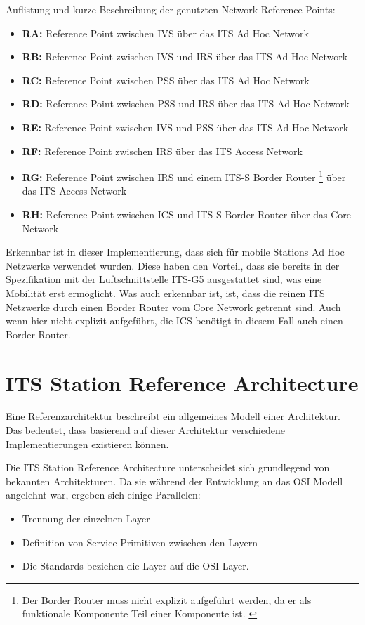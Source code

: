 Auflistung und kurze Beschreibung der genutzten Network Reference Points:
\begin{itemize}
	\item \textbf{RA: } Reference Point zwischen \ac{IVS} über das ITS Ad Hoc Network
	\item \textbf{RB: } Reference Point zwischen \ac{IVS} und \ac{IRS} über das ITS Ad Hoc Network
	\item \textbf{RC: } Reference Point zwischen \ac{PSS} über das ITS Ad Hoc Network
	\item \textbf{RD: } Reference Point zwischen \ac{PSS} und \ac{IRS} über das ITS Ad Hoc Network
	\item \textbf{RE: } Reference Point zwischen \ac{IVS} und \ac{PSS} über das ITS Ad Hoc Network
	\item \textbf{RF: } Reference Point zwischen \ac{IRS} über das ITS Access Network
	\item \textbf{RG: } Reference Point zwischen \ac{IRS} und einem ITS-S Border Router \footnote{Der Border Router muss nicht explizit aufgeführt werden, da er als funktionale Komponente Teil einer Komponente ist. \label{ftn:borderRouter}} über das ITS Access Network 
	\item \textbf{RH: } Reference Point zwischen \ac{ICS} und ITS-S Border Router  über das Core Network		
\end{itemize}

Erkennbar ist in dieser Implementierung, dass sich für mobile Stations Ad Hoc Netzwerke verwendet wurden. Diese haben den Vorteil, dass sie bereits in der Spezifikation mit der Luftschnittstelle ITS-G5 ausgestattet sind, was eine Mobilität erst ermöglicht. Was auch erkennbar ist, ist, dass die reinen ITS Netzwerke durch einen Border Router vom Core Network getrennt sind. Auch wenn hier nicht explizit aufgeführt, die \ac{ICS} benötigt in diesem Fall auch einen Border Router.

 
\section{ITS Station Reference Architecture}
Eine Referenzarchitektur beschreibt ein allgemeines Modell einer Architektur. Das bedeutet, dass basierend auf dieser Architektur verschiedene Implementierungen existieren können. 

Die \ac{ITS} Station Reference Architecture unterscheidet sich grundlegend von bekannten Architekturen. Da sie während der Entwicklung an das \ac{OSI} Modell angelehnt war, ergeben sich einige Parallelen:
\begin{itemize}
	\item Trennung der einzelnen Layer
	\item Definition von Service Primitiven zwischen den Layern
	\item Die Standards beziehen die Layer auf die \ac{OSI} Layer. 
\end{itemize}

